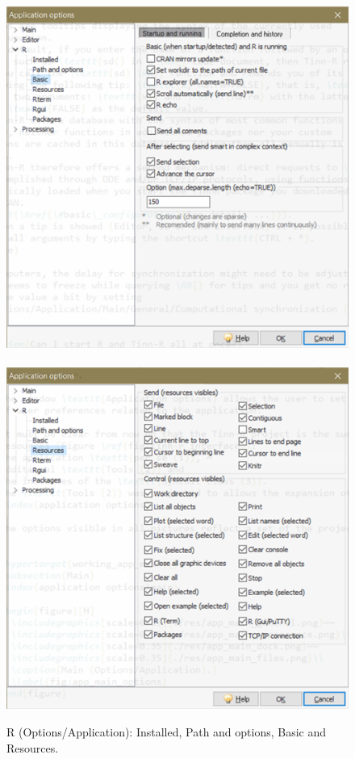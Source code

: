 \begin{figure}[h!]
  \includegraphics[scale=0.6]{./res/app_r_basic.png}~~
  \includegraphics[scale=0.6]{./res/app_r_resources.png}\\
  \caption{R (Options/Application): Installed, Path and options, Basic and Resources.}
  \label{fig:app_r_a}
\end{figure}

